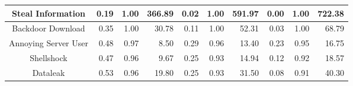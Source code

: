 \begin{table*}[]
{\begin{tabular}{c|r|r|r|r|r|r|r|r|r}
Steal Information    & 0.19                                               & 1.00                                                 & 366.89                                             & 0.02                                               & 1.00                                                 & 591.97                                             & 0.00                                               & 1.00                                                 & 722.38                                            \\ \hline
Backdoor Download    & 0.35                                               & 1.00                                                 & 30.78                                              & 0.11                                               & 1.00                                                 & 52.31                                              & 0.03                                               & 1.00                                                 & 68.79                                             \\ \hline
Annoying Server User & 0.48                                               & 0.97                                                 & 8.50                                               & 0.29                                               & 0.96                                                 & 13.40                                              & 0.23                                               & 0.95                                                 & 16.75                                             \\ \hline
Shellshock           & 0.47                                               & 0.96                                                 & 9.67                                               & 0.25                                               & 0.93                                                 & 14.94                                              & 0.12                                               & 0.92                                                 & 18.57                                             \\ \hline
Dataleak             & 0.53                                               & 0.96                                                 & 19.80                                              & 0.25                                               & 0.93                                                 & 31.50                                              & 0.08                                               & 0.91                                                 & 40.30                                             \\ \hline

\end{tabular}}
\end{table*}
